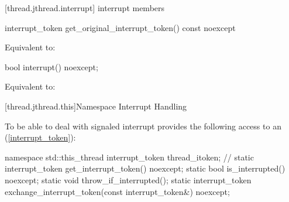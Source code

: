 [thread.jthread.interrupt]{ interrupt members}

{\color{diffcolor}
%
\begin{itemdecl}
interrupt_token get_original_interrupt_token() const noexcept
\end{itemdecl}
\begin{itemdescr}
  \pnum\effects Equivalent to: 
\end{itemdescr}

%
\begin{itemdecl}
bool interrupt() noexcept;
\end{itemdecl}
\begin{itemdescr}
  \pnum\effects Equivalent to: 
\end{itemdescr}
}%

%
%
%

[thread.jthread.this]{Namespace  Interrupt Handling}

To be able to deal with signaled interrupt
 provides the following access to an  (\ref{interrupt_token}):

\begin{codeblock}
namespace std::this_thread {
  interrupt_token thread_itoken;                 // \expos
  static interrupt_token get_interrupt_token() noexcept;
  static bool is_interrupted() noexcept;
  static void throw_if_interrupted();
  static interrupt_token exchange_interrupt_token(const interrupt_token&) noexcept;
}
\end{codeblock}

